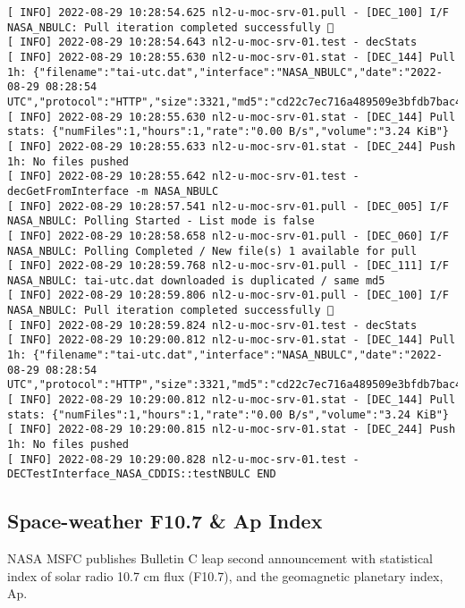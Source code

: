 \documentclass[dec_sum_main.tex]{subfiles}
\begin{document}
\begin{Verbatim}[fontsize=\tiny]
[ INFO] 2022-08-29 10:28:54.625 nl2-u-moc-srv-01.pull - [DEC_100] I/F NASA_NBULC: Pull iteration completed successfully 🕺
[ INFO] 2022-08-29 10:28:54.643 nl2-u-moc-srv-01.test - decStats
[ INFO] 2022-08-29 10:28:55.630 nl2-u-moc-srv-01.stat - [DEC_144] Pull 1h: {"filename":"tai-utc.dat","interface":"NASA_NBULC","date":"2022-08-29 08:28:54 UTC","protocol":"HTTP","size":3321,"md5":"cd22c7ec716a489509e3bfdb7bac42fc"}
[ INFO] 2022-08-29 10:28:55.630 nl2-u-moc-srv-01.stat - [DEC_144] Pull stats: {"numFiles":1,"hours":1,"rate":"0.00 B/s","volume":"3.24 KiB"}
[ INFO] 2022-08-29 10:28:55.633 nl2-u-moc-srv-01.stat - [DEC_244] Push 1h: No files pushed
[ INFO] 2022-08-29 10:28:55.642 nl2-u-moc-srv-01.test - decGetFromInterface -m NASA_NBULC
[ INFO] 2022-08-29 10:28:57.541 nl2-u-moc-srv-01.pull - [DEC_005] I/F NASA_NBULC: Polling Started - List mode is false
[ INFO] 2022-08-29 10:28:58.658 nl2-u-moc-srv-01.pull - [DEC_060] I/F NASA_NBULC: Polling Completed / New file(s) 1 available for pull
[ INFO] 2022-08-29 10:28:59.768 nl2-u-moc-srv-01.pull - [DEC_111] I/F NASA_NBULC: tai-utc.dat downloaded is duplicated / same md5
[ INFO] 2022-08-29 10:28:59.806 nl2-u-moc-srv-01.pull - [DEC_100] I/F NASA_NBULC: Pull iteration completed successfully 🕺
[ INFO] 2022-08-29 10:28:59.824 nl2-u-moc-srv-01.test - decStats
[ INFO] 2022-08-29 10:29:00.812 nl2-u-moc-srv-01.stat - [DEC_144] Pull 1h: {"filename":"tai-utc.dat","interface":"NASA_NBULC","date":"2022-08-29 08:28:54 UTC","protocol":"HTTP","size":3321,"md5":"cd22c7ec716a489509e3bfdb7bac42fc"}
[ INFO] 2022-08-29 10:29:00.812 nl2-u-moc-srv-01.stat - [DEC_144] Pull stats: {"numFiles":1,"hours":1,"rate":"0.00 B/s","volume":"3.24 KiB"}
[ INFO] 2022-08-29 10:29:00.815 nl2-u-moc-srv-01.stat - [DEC_244] Push 1h: No files pushed
[ INFO] 2022-08-29 10:29:00.828 nl2-u-moc-srv-01.test - DECTestInterface_NASA_CDDIS::testNBULC END
\end{Verbatim}

\subsection{Space-weather F10.7 \& Ap Index}
NASA MSFC publishes Bulletin C leap second announcement with statistical index of solar radio 10.7 cm flux (F10.7), and the geomagnetic planetary index, Ap.\newline

 \newline
\end{document}
